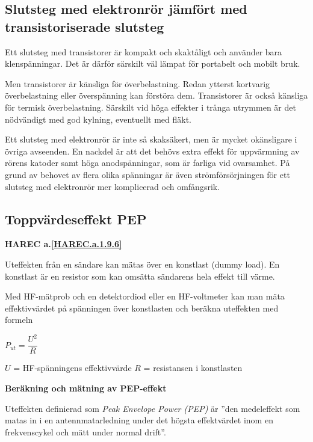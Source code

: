 \subsection{Slutsteg med elektronrör jämfört med transistoriserade slutsteg}

Ett slutsteg med transistorer är kompakt och skaktåligt och använder
bara klenspänningar.
Det är därför särskilt väl lämpat för portabelt och mobilt bruk.

Men transistorer är känsliga för överbelastning.
Redan ytterst kortvarig överbelastning eller överspänning kan förstöra dem.
Transistorer är också känsliga för termisk överbelastning.
Särskilt vid höga effekter i trånga utrymmen är det nödvändigt med god kylning,
eventuellt med fläkt.

Ett slutsteg med elektronrör är inte så skaksäkert, men är mycket okänsligare
i övriga avseenden.
En nackdel är att det behövs extra effekt för uppvärmning av rörens katoder
samt höga anodspänningar, som är farliga vid ovarsamhet.
På grund av behovet av flera olika spänningar är även strömförsörjningen för
ett slutsteg med elektronrör mer komplicerad och omfångsrik.

\subsection{Toppvärdeseffekt PEP}
\textbf{HAREC a.\ref{HAREC.a.1.9.6}\label{myHAREC.a.1.9.6}}
\label{PEP-effekt}

Uteffekten från en sändare kan mätas över en konstlast (dummy load).
En konstlast är en resistor som kan omsätta sändarens hela effekt till värme.

Med HF-mätprob och en detektordiod eller en HF-voltmeter kan man mäta
effektivvärdet på spänningen över konstlasten och beräkna uteffekten med
formeln

\(P_{ut} = \dfrac{U^2}{R}\)

\(U\) = HF-spänningens effektivvärde
\(R\) = resistansen i konstlasten

\textbf{Beräkning och mätning av PEP-effekt}

Uteffekten definierad som \emph{Peak Envelope Power (PEP)} \cite[1.157]{ITU-RR}
är ''den medeleffekt som matas in i en antennmatarledning under det högsta
effektvärdet inom en frekvenscykel och mätt under normal drift''.

